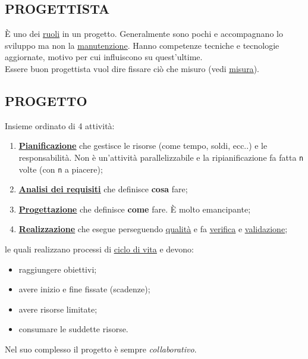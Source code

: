 		
		\subsection{PROGETTISTA}  \label{progettista}
		È uno dei \underline{\hyperref[ruoli]{ruoli}} in un progetto. Generalmente sono pochi e accompagnano lo sviluppo ma non la \underline{\hyperref[manutenzione]{manutenzione}}. Hanno competenze tecniche e tecnologie aggiornate, motivo per cui influiscono su quest'ultime. \\
		Essere buon progettista vuol dire fissare ciò che misuro (vedi \underline{\hyperref[misura]{misura}}).
		
		\subsection{PROGETTO}  \label{progetto}
		Insieme ordinato di 4 attività:
			\begin{enumerate}
				\item \underline{\hyperref[pianificazione]{\textbf{Pianificazione}}} che gestisce le risorse (come tempo, soldi, ecc..) e le responsabilità. Non è un'attività parallelizzabile e la ripianificazione fa fatta \texttt{n} volte (con \texttt{n} a piacere);
				\item \underline{\hyperref[analisideirequisiti]{\textbf{Analisi dei requisiti}}} che definisce \textbf{cosa} fare;
				\item \underline{\hyperref[progettazione]{\textbf{Progettazione}}} che definisce \textbf{come} fare. È molto emancipante;
				\item \underline{\hyperref[realizzazione]{\textbf{Realizzazione}}} che esegue perseguendo \underline{\hyperref[qualita]{qualità}} e fa \underline{\hyperref[verificare]{verifica}} e \underline{\hyperref[validare]{validazione}};
			\end{enumerate}	
		le quali realizzano processi di \underline{\hyperref[ciclo]{ciclo di vita}} e devono:
			\begin {itemize}
				\item raggiungere obiettivi;
				\item avere inizio e fine fissate (scadenze);
				\item avere risorse limitate;
				\item consumare le suddette risorse.
			\end {itemize}
		Nel suo complesso il progetto è sempre \textit{collaborativo}.
